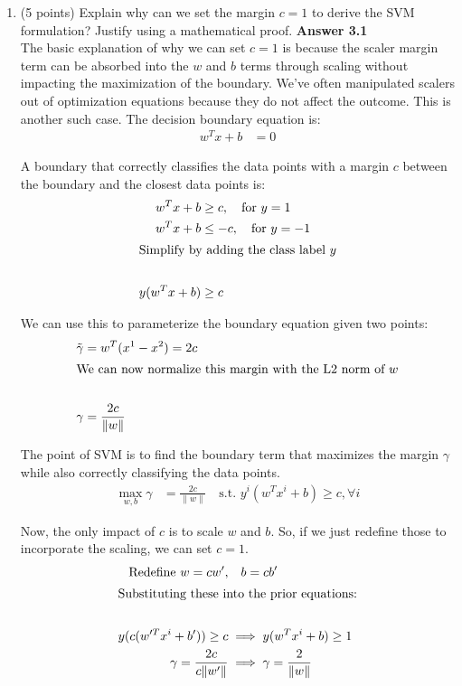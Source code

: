 \documentclass[twoside,10pt]{article}
\begin{document}
\begin{enumerate}
\item (5 points) Explain why can we set the margin $c = 1$ to derive the SVM formulation? Justify using a mathematical proof.
{\bf Answer 3.1}\\
The basic explanation of why we can set $c=1$ is because the scaler margin term can be absorbed into the $w$ and $b$ terms through scaling without impacting the maximization of the boundary. We've often manipulated scalers out of optimization equations because they do not affect the outcome. This is another such case. The decision boundary equation is:
\begin{align*}
    w^Tx + b &= 0
\end{align*}

A boundary that correctly classifies the data points with a margin $c$ between the boundary and the closest data points is:
\begin{align*}
    w^Tx + b &\geq c, \quad \text{for } y = 1 \\
    w^Tx + b &\leq -c, \quad \text{for } y = -1 \\
    \intertext{Simplify by adding the class label $y$} \\
    y(w^Tx + b) &\geq c
\end{align*}

We can use this to parameterize the boundary equation given two points:
\begin{align*}
    \tilde{\gamma} &= w^T(x^1 - x^2) = 2c \\
    \intertext{We can now normalize this margin with the L2 norm of $w$} \\
    \gamma &= \frac{2c}{\|w\|}
\end{align*}

The point of SVM is to find the boundary term that maximizes the margin $\gamma$ while also correctly classifying the data points.
\begin{align*}
    \max_{w,b} \gamma &= \frac{2c}{\|w\|} \quad \text{s.t. } y^i(w^Tx^i + b) \geq c, \forall i
\end{align*}

Now, the only impact of $c$ is to scale $w$ and $b$. So, if we just redefine those to incorporate the scaling, we can set $c=1$. 
\begin{align*}
    \text{Redefine } w = cw', &\quad b = cb' \\
    \intertext{Substituting these into the prior equations:} \\
    y(c (w'^Tx^i + b')) \geq c &\implies y(w^Tx^i + b) \geq 1 \\
    \gamma = \frac{2c}{c\|w'\|} &\implies \gamma = \frac{2}{\|w\|}
\end{align*}


\end{enumerate}
\end{document}
